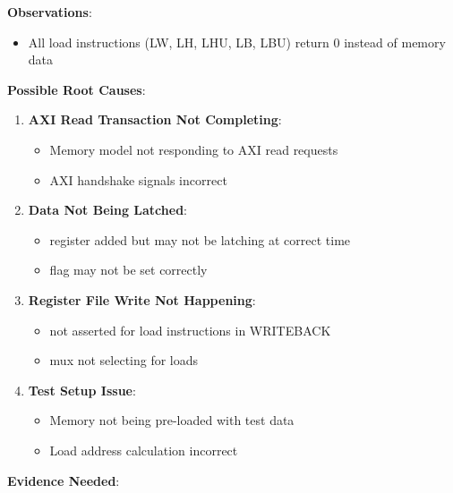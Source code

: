 \begin{record}

\textbf{Observations}:

\begin{itemize}
\tightlist
\item
  All load instructions (LW, LH, LHU, LB, LBU) return 0 instead of
  memory data
\end{itemize}

\textbf{Possible Root Causes}:

\begin{enumerate}
\def\labelenumi{\arabic{enumi}.}
\item
  \textbf{AXI Read Transaction Not Completing}:

  \begin{itemize}
  \tightlist
  \item
    Memory model not responding to AXI read requests
  \item
    AXI handshake signals incorrect
  \end{itemize}
\item
  \textbf{Data Not Being Latched}:

  \begin{itemize}
  \tightlist
  \item
     register added but may not be latching at
    correct time
  \item
     flag may not be set correctly
  \end{itemize}
\item
  \textbf{Register File Write Not Happening}:

  \begin{itemize}
  \tightlist
  \item
     not asserted for load instructions in WRITEBACK
  \item
     mux not selecting  for loads
  \end{itemize}
\item
  \textbf{Test Setup Issue}:

  \begin{itemize}
  \tightlist
  \item
    Memory not being pre-loaded with test data
  \item
    Load address calculation incorrect
  \end{itemize}
\end{enumerate}

\textbf{Evidence Needed}:


\end{record}
